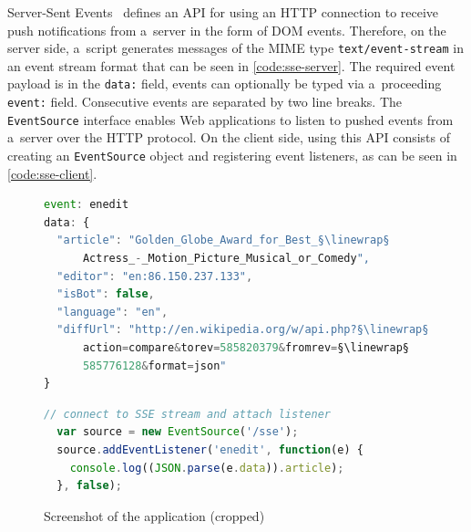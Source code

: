 \documentclass{sig-alternate-2013}
\newcommand{\linewrap}{\raisebox{-.6ex}{\textcolor{grey}{$\hookleftarrow$}}}
\begin{document}
Server-Sent Events~\cite{hickson2012sse}
defines an API for using an HTTP connection
to receive push notifications from a~server
in the form of DOM events.
Therefore, on the server side, a~script generates messages
of the MIME type \texttt{text/event-stream}
in an event stream format that can be seen
in \autoref{code:sse-server}.
The required event payload is in the \texttt{data:} field,
events can optionally be typed via a~proceeding \texttt{event:} field.
Consecutive events are separated by two line breaks.
The \texttt{EventSource} interface enables Web applications
to listen to pushed events from a~server over the HTTP protocol.
On the client side, using this API consists of creating
an \texttt{EventSource} object and registering event listeners,
as can be seen in \autoref{code:sse-client}.

\begin{figure}[h!]
  \begin{lstlisting}[caption={Server-Sent Event of type ``enedit''
    (formatted for legibility, \texttt{data:} allows no line breaks)},
    label=code:sse-server, language=JavaScript]
event: enedit
data: {
  "article": "Golden_Globe_Award_for_Best_§\linewrap§
      Actress_-_Motion_Picture_Musical_or_Comedy",
  "editor": "en:86.150.237.133",
  "isBot": false,
  "language": "en",
  "diffUrl": "http://en.wikipedia.org/w/api.php?§\linewrap§
      action=compare&torev=585820379&fromrev=§\linewrap§
      585776128&format=json"
}
  \end{lstlisting}

  \vspace{-1.5em}
  \begin{lstlisting}[caption={\texttt{EventSource}
    object with event listener},
    label=code:sse-client, language=JavaScript]
  // connect to SSE stream and attach listener
  var source = new EventSource('/sse');
  source.addEventListener('enedit', function(e) {
    console.log((JSON.parse(e.data)).article);
  }, false);
  \end{lstlisting}

  \vspace{-0.5em}
  \caption{Screenshot of the application (cropped)}
  \label{fig:screenshot}
\end{figure}
\end{document}
